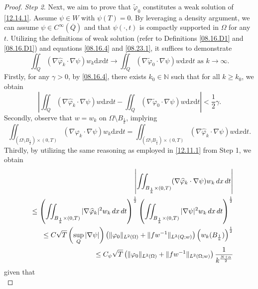 \documentclass[10pt,a4paper]{amsart}
\def\crr{\cr\noalign{\vskip-0.0mm}}
\begin{document}
\begin{proof}
 {\it Step 2}. Next, we aim to prove that $\widetilde{\varphi}_0$ constitutes a weak solution of \eqref{12.14.1}.
Assume $\psi\in W$ with $\psi(T)=0$. By leveraging a density argument, we can assume $\psi\in C^\infty(\overline{Q})$ and that $\psi(\cdot, t)$ is compactly supported in $\Omega$ for any $t$. Utilizing the definitions of weak solution (refer to Definitions \ref{08.16.D1} and \ref{08.16.D1}) and equations \eqref{08.16.4} and \eqref{08.23.1}, it suffices to demonstrate
\begin{equation}\label{08.16.5}
\iint_Q(\nabla\widehat{\varphi}_k\cdot \nabla\psi)w_k\mathrm{d} x\mathrm{d} t\to \iint_Q(\nabla\widetilde{\varphi}_0\cdot\nabla\psi)w\mathrm{d} x\mathrm{d} t   \text{  as } k\to \infty.
\end{equation}
Firstly, for any $\gamma>0$, by \eqref{08.16.4}, there exists $k_0\in\mathbb{N}$ such that for all $k\geq k_0$, we obtain
\begin{equation}\label{08.16.6}
\left|\iint_Q(\nabla\widehat{\varphi}_k\cdot\nabla\psi)w\mathrm{d} x\mathrm{d} t-\iint_Q(\nabla\widetilde{\varphi}_0\cdot\nabla\psi)w\mathrm{d} x\mathrm{d} t\right|<\frac{1}{2}\gamma.
\end{equation}
Secondly, observe that $w=w_k$ on $\Omega\setminus B_{\frac{1}{k}}$, implying
\begin{equation}\label{08.16.7}
\iint_{(\Omega\setminus B_{\frac{1}{k}})\times (0,T)}(\nabla\widehat{\varphi}_k\cdot\nabla\psi)w_k\mathrm{d} x\mathrm{d} t=\iint_{(\Omega\setminus B_{\frac{1}{k}})\times (0,T)}(\nabla \widehat{\varphi}_k\cdot\nabla\psi)w\mathrm{d} x\mathrm{d} t.
\end{equation}
 Thirdly, by utilizing the same reasoning as employed in \eqref{12.11.1} from Step 1, we obtain
\begin{eqnarray}\label{08.16.9}
&&\left|\iint_{B_{\frac{1}{k}} \times (0,T)} (\nabla\widehat{\varphi}_k \cdot \nabla\psi) w_k \, dx \, dt\right| \crr
&&\leq \left(\iint_{B_{\frac{1}{k}} \times (0,T)} |\nabla\widehat{\varphi}_k|^2 w_k \, dx \, dt\right)^{\frac{1}{2}} \left(\iint_{B_{\frac{1}{k}} \times (0,T)} |\nabla\psi|^2 w_k \, dx \, dt\right)^{\frac{1}{2}} \crr
&&\leq C\sqrt{T} \left(\sup_{Q} |\nabla\psi|\right) \left(\|\varphi_0\|_{L^2(\Omega)} + \|f w^{-1}\|_{L^2(Q; w)}\right) \left(w_k(B_{\frac{1}{k}})\right)^{\frac{1}{2}} \crr
&&\leq C_\psi \sqrt{T} \left(\|\varphi_0\|_{L^2(\Omega)} + \|f w^{-1}\|_{L^2(\Omega; w)}\right) \frac{1}{k^{\frac{N+\alpha}{2}}}
\end{eqnarray}
given that
\begin{equation*}

\end{equation*}
\end{proof}
\end{document}
